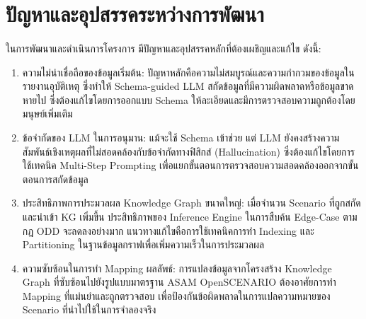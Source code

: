 \section{ปัญหาและอุปสรรคระหว่างการพัฒนา}\label{sec:ch4_issues}
\paragraph{}

ในการพัฒนาและดำเนินการโครงการ มีปัญหาและอุปสรรคหลักที่ต้องเผชิญและแก้ไข ดังนี้:

\begin{enumerate}
    \item ความไม่น่าเชื่อถือของข้อมูลเริ่มต้น: ปัญหาหลักคือความไม่สมบูรณ์และความกำกวมของข้อมูลในรายงานอุบัติเหตุ ซึ่งทำให้ Schema-guided LLM สกัดข้อมูลที่มีความผิดพลาดหรือข้อมูลขาดหายไป ซึ่งต้องแก้ไขโดยการออกแบบ Schema ให้ละเอียดและมีการตรวจสอบความถูกต้องโดยมนุษย์เพิ่มเติม
    \item ข้อจำกัดของ LLM ในการอนุมาน: แม้จะใช้ Schema เข้าช่วย แต่ LLM ยังคงสร้างความสัมพันธ์เชิงเหตุผลที่ไม่สอดคล้องกับข้อจำกัดทางฟิสิกส์ (Hallucination) ซึ่งต้องแก้ไขโดยการใช้เทคนิค Multi-Step Prompting เพื่อแยกขั้นตอนการตรวจสอบความสอดคล้องออกจากขั้นตอนการสกัดข้อมูล
    \item ประสิทธิภาพการประมวลผล Knowledge Graph ขนาดใหญ่: เมื่อจำนวน Scenario ที่ถูกสกัดและนำเข้า KG เพิ่มขึ้น ประสิทธิภาพของ Inference Engine ในการสืบค้น Edge-Case ตามกฎ ODD จะลดลงอย่างมาก แนวทางแก้ไขคือการใช้เทคนิคการทำ Indexing และ Partitioning ในฐานข้อมูลกราฟเพื่อเพิ่มความเร็วในการประมวลผล
    \item ความซับซ้อนในการทำ Mapping ผลลัพธ์: การแปลงข้อมูลจากโครงสร้าง Knowledge Graph ที่ซับซ้อนไปยังรูปแบบมาตรฐาน ASAM OpenSCENARIO ต้องอาศัยการทำ Mapping ที่แม่นยำและถูกตรวจสอบ เพื่อป้องกันข้อผิดพลาดในการแปลความหมายของ Scenario ที่นำไปใช้ในการจำลองจริง
\end{enumerate}